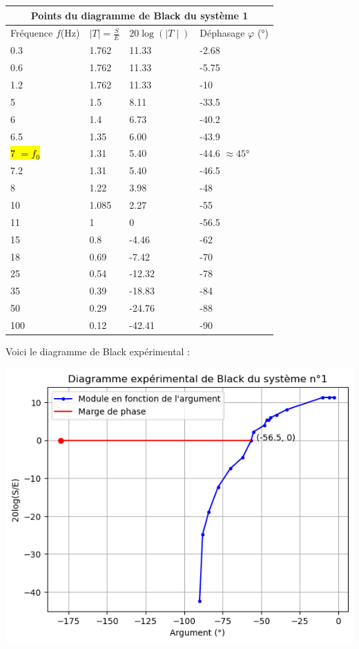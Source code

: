 \documentclass[12pt]{article}
\begin{document}
\begin{center}
\begin{tabular}{ |p{3cm}|p{3cm}|p{3cm}|p{3cm}| }
    \hline
    \multicolumn{4}{|c|}{Points du diagramme de Black du système 1} \\
    \hline
    Fréquence $f$(Hz) & $\mid T \mid = \frac{S}{E}$ & $20 \log(\mid T \mid)$ & Déphasage $\varphi $ (°)\\
    \hline
    0.3 & 1.762 & 11.33 & -2.68 \\
    0.6 & 1.762 & 11.33 & -5.75 \\
    1.2 & 1.762 & 11.33 & -10 \\
    5 & 1.5 &  8.11 & -33.5 \\
    6 & 1.4 &  6.73 & -40.2 \\
    6.5 & 1.35 &  6.00 & -43.9   \\
    \hl{7 $= f_0$}& 1.31 & 5.40 & -44.6 $\approx 45$°\\
    7.2 & 1.31 & 5.40 & -46.5 \\
    8 & 1.22 & 3.98 & -48\\
    10 & 1.085 & 2.27 & -55\\
    11 & 1 &  0 & -56.5 \\
    15 & 0.8 &  -4.46 & -62 \\
    18 & 0.69 & -7.42 &-70 \\
    25 & 0.54 & -12.32 & -78 \\
    35 & 0.39 & -18.83 & -84 \\
    50 & 0.29 & -24.76 & -88 \\
    100 & 0.12 & -42.41 & -90 \\
    \hline
    \end{tabular}
\end{center}

Voici le diagramme de Black expérimental : 
\begin{center}
    \includegraphics{Diagramme de Black experimental 2.1.png}
\end{center}
\end{document}
